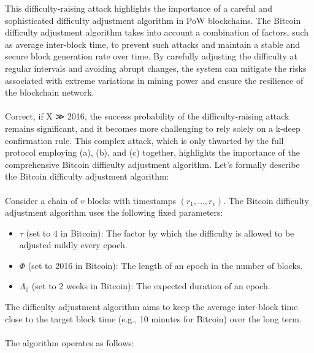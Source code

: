 \documentclass{report}
\begin{document}
This difficulty-raising attack highlights the importance of a careful and sophisticated difficulty adjustment algorithm in PoW blockchains. The Bitcoin difficulty adjustment algorithm takes into account a combination of factors, such as average inter-block time, to prevent such attacks and maintain a stable and secure block generation rate over time. By carefully adjusting the difficulty at regular intervals and avoiding abrupt changes, the system can mitigate the risks associated with extreme variations in mining power and ensure the resilience of the blockchain network.\\\\
Correct, if X ≫ 2016, the success probability of the difficulty-raising attack remains significant, and it becomes more challenging to rely solely on a k-deep confirmation rule. This complex attack, which is only thwarted by the full protocol employing (a), (b), and (c) together, highlights the importance of the comprehensive Bitcoin difficulty adjustment algorithm. Let's formally describe the Bitcoin difficulty adjustment algorithm:\\\\
Consider a chain of $v$ blocks with timestamps $(r_1, \ldots, r_v)$. The Bitcoin difficulty adjustment algorithm uses the following fixed parameters:

\begin{itemize}
	\item $\tau$ (set to 4 in Bitcoin): The factor by which the difficulty is allowed to be adjusted mildly every epoch.
	\item $\Phi$ (set to 2016 in Bitcoin): The length of an epoch in the number of blocks.
	\item $\Lambda_0$ (set to 2 weeks in Bitcoin): The expected duration of an epoch.
\end{itemize}

The difficulty adjustment algorithm aims to keep the average inter-block time close to the target block time (e.g., 10 minutes for Bitcoin) over the long term.\\\\
The algorithm operates as follows:
\end{document}
